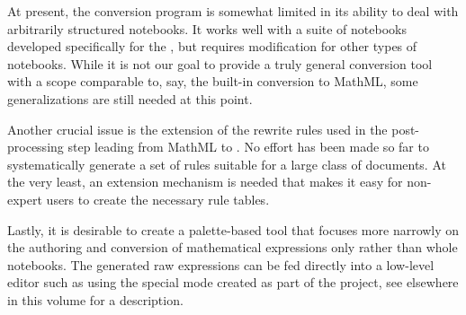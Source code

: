 At present, the conversion program is somewhat limited in its ability to deal with
arbitrarily structured notebooks.  It works well with a suite of notebooks developed
specifically for the {}, but requires modification for other types
of notebooks.  While it is not our goal to provide a truly general conversion tool with a
scope comparable to, say, the built-in conversion to MathML, some generalizations are
still needed at this point.

Another crucial issue is the extension of the rewrite rules used in the post-processing
step leading from MathML to {\openmath}.  No effort has been made so far to systematically
generate a set of rules suitable for a large class of documents.  At the very least, an
extension mechanism is needed that makes it easy for non-expert users to create the
necessary rule tables.

Lastly, it is desirable to create a {\mathematica} palette-based tool that focuses
more narrowly on the authoring and conversion of mathematical expressions only
rather than whole notebooks.  The generated raw {\openmath} expressions can be fed
directly into a low-level editor such as {} using the special {\omdoc} mode
created as part of the {\ccaps} project, see elsewhere in this volume for a
description.


